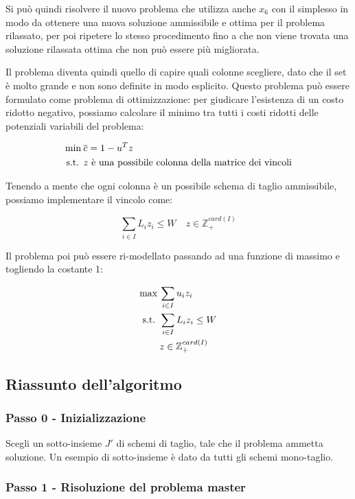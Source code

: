 Si può quindi risolvere il nuovo problema che utilizza anche $x_6$ con il simplesso in modo da ottenere una nuova soluzione ammissibile e ottima per il problema rilassato, per poi ripetere lo stesso procedimento fino a che non viene trovata una soluzione rilassata ottima che non può essere più migliorata.

Il problema diventa quindi quello di capire quali colonne scegliere, dato che il set è molto grande e non sono definite in modo esplicito.
Questo problema può essere formulato come problema di ottimizzazione: per giudicare l'esistenza di un costo ridotto negativo, possiamo calcolare il minimo tra tutti i costi ridotti delle potenziali variabili del problema:

\begin{align*}
\min \:& \overline{c} = 1 - u^T z \\
\text{s.t. }    & z \text{ è una possibile colonna della matrice dei vincoli}
\end{align*}

Tenendo a mente che ogni colonna è un possibile schema di taglio ammissibile, possiamo implementare il vincolo come:

$$
\sum\limits_{i \in I} L_i z_i \leq W \quad z \in \mathbb{Z}_{+}^{card(I)}
$$

Il problema poi può essere ri-modellato passando ad una funzione di massimo e togliendo la costante 1:

\begin{align*}
\max \:& \sum\limits_{i \in I} u_i z_i \\
\text{s.t. }    & \sum\limits_{i \in I} L_i z_i \leq W \\
	   &z \in \mathbb{Z}_{+}^{card(I)}
\end{align*}

\subsection{Riassunto dell'algoritmo}

\subsubsection{Passo 0 - Inizializzazione}

Scegli un sotto-insieme $J'$ di schemi di taglio, tale che il problema ammetta soluzione.
Un esempio di sotto-insieme è dato da tutti gli schemi mono-taglio.

\subsubsection{Passo 1 - Risoluzione del problema master}

